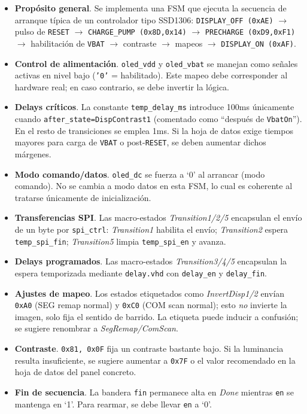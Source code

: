 \documentclass[a4paper,12pt]{article}
\begin{document}
\begin{itemize}
  \item \textbf{Propósito general}. Se implementa una FSM que ejecuta la secuencia de arranque típica de un controlador tipo SSD1306: \texttt{DISPLAY\_OFF (0xAE)} \(\rightarrow\) pulso de \texttt{RESET} \(\rightarrow\) \texttt{CHARGE\_PUMP (0x8D,0x14)} \(\rightarrow\) \texttt{PRECHARGE (0xD9,0xF1)} \(\rightarrow\) habilitación de \texttt{VBAT} \(\rightarrow\) contraste \(\rightarrow\) mapeos \(\rightarrow\) \texttt{DISPLAY\_ON (0xAF)}.
  \item \textbf{Control de alimentación}. \texttt{oled\_vdd} y \texttt{oled\_vbat} se manejan como señales activas en nivel bajo (\texttt{'0'} = habilitado). Este mapeo debe corresponder al hardware real; en caso contrario, se debe invertir la lógica.
  \item \textbf{Delays críticos}. La constante \texttt{temp\_delay\_ms} introduce {100}{ms} únicamente cuando \texttt{after\_state=DispContrast1} (comentado como “después de \texttt{VbatOn}”). En el resto de transiciones se emplea {1}{ms}. Si la hoja de datos exige tiempos mayores para carga de \texttt{VBAT} o post-\texttt{RESET}, se deben aumentar dichos márgenes.
  \item \textbf{Modo comando/datos}. \texttt{oled\_dc} se fuerza a ‘0’ al arrancar (modo comando). No se cambia a modo datos en esta FSM, lo cual es coherente al tratarse únicamente de inicialización.
  \item \textbf{Transferencias SPI}. Las macro-estados \emph{Transition1/2/5} encapsulan el envío de un byte por \texttt{spi\_ctrl}:  
        \emph{Transition1} habilita el envío; \emph{Transition2} espera \texttt{temp\_spi\_fin}; \emph{Transition5} limpia \texttt{temp\_spi\_en} y avanza.
  \item \textbf{Delays programados}. Las macro-estados \emph{Transition3/4/5} encapsulan la espera temporizada mediante \texttt{delay.vhd} con \texttt{delay\_en} y \texttt{delay\_fin}.
  \item \textbf{Ajustes de mapeo}. Los estados etiquetados como \emph{InvertDisp1/2} envían \texttt{0xA0} (SEG remap normal) y \texttt{0xC0} (COM scan normal); esto \emph{no} invierte la imagen, solo fija el sentido de barrido. La etiqueta puede inducir a confusión; se sugiere renombrar a \emph{SegRemap/ComScan}.
  \item \textbf{Contraste}. \texttt{0x81, 0x0F} fija un contraste bastante bajo. Si la luminancia resulta insuficiente, se sugiere aumentar a \texttt{0x7F} o el valor recomendado en la hoja de datos del panel concreto.
  \item \textbf{Fin de secuencia}. La bandera \texttt{fin} permanece alta en \emph{Done} mientras \texttt{en} se mantenga en ‘1’. Para rearmar, se debe llevar \texttt{en} a ‘0’.
\end{itemize}
\end{document}

